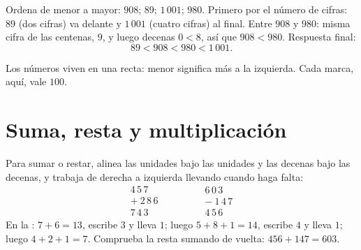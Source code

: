 \begin{example}\label{ex:g6:wholes:order}
Ordena de menor a mayor: $908$; $89$; $1\,001$; $980$.
Primero por el número de cifras: $89$ (dos cifras) va delante y $1\,001$ (cuatro
cifras) al final. Entre $908$ y $980$: misma cifra de las centenas, $9$, y luego
decenas $0 < 8$, así que $908 < 980$. Respuesta final:
\[
89 < 908 < 980 < 1\,001 .
\]
\end{example}

\begin{omfigure}

{\small Los números viven en una recta: menor significa más a la izquierda. Cada marca,
aquí, vale $100$.}
\end{omfigure}

\section{Suma, resta y multiplicación}

\begin{example}\label{ex:g6:wholes:columns}
Para sumar o restar, alinea las unidades bajo las unidades y las decenas bajo las
decenas, y trabaja de derecha a izquierda llevando cuando haga falta:
\[
\begin{array}{r}
4\,5\,7 \\
+\ 2\,8\,6 \\
\hline
7\,4\,3
\end{array}
\qquad\qquad
\begin{array}{r}
6\,0\,3 \\
-\ 1\,4\,7 \\
\hline
4\,5\,6
\end{array}
\]
En la : $7 + 6 = 13$, escribe $3$ y lleva $1$; luego
$5 + 8 + 1 = 14$, escribe $4$ y lleva $1$; luego $4 + 2 + 1 = 7$.
Comprueba la resta sumando de vuelta: $456 + 147 = 603$.
\end{example}

